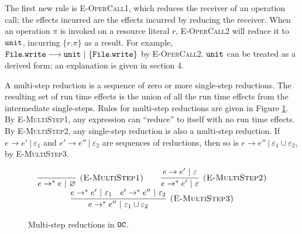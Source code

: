 The first new rule is \textsc{E-OperCall1}, which reduces the receiver of an operation call; the effects incurred are the effects incurred by reducing the receiver.  When an operation $\pi$ is invoked on a resource literal $r$, \textsc{E-OperCall2} will reduce it to $\mathtt{unit}$,
incurring $\{ r.\pi \}$ as a result. For example, $\mathtt{File.write} \longrightarrow \mathtt{unit}~|~\{ \mathtt{File.write} \}$ by \textsc{E-OperCall2}. $\mathtt{unit}$ can be treated as a derived form; an explanation is given in section 4.

A multi-step reduction is a sequence of zero
or more single-step reductions. The resulting set of run time effects is the union of all the run time effects from the intermediate single-steps. Rules for multi-step reductions are given in Figure \ref{fig:opercalc_multistep_defn}. By \textsc{E-MultiStep1}, any expression can ``reduce'' to itself with no run time effects. By \textsc{E-MultiStep2}, any single-step reduction is also a multi-step reduction. If $e \longrightarrow e'~|~\varepsilon_1$ and $e' \longrightarrow e''~|~\varepsilon_2$ are sequences of reductions, then so is $e \longrightarrow e''~|~\varepsilon_1 \cup \varepsilon_2$, by \textsc{E-MultiStep3}.

\begin{figure}[h]

\noindent
{}

\[
\begin{array}{c}

\infer[\textsc{(E-MultiStep1)}]
	{ e \rightarrow^{*}  e~|~\varnothing}
	{}
	\hspace{5ex}
\infer[\textsc{(E-MultiStep2)}]
	{ e \rightarrow^{*}  e'~|~\varepsilon}
	{ e \rightarrow  e'~|~\varepsilon}
\\
\infer[\textsc{(E-MultiStep3)}]
	{ e \rightarrow^{*}  e''~|~\varepsilon_1 \cup \varepsilon_2}
	{ e \rightarrow^{*}  e'~|~\varepsilon_1 &  e' \rightarrow^{*}  e''~|~\varepsilon_2}
\end{array}
\]

\vspace{-7pt}
\caption{Multi-step reductions in $\mathtt{OC}$.}
\label{fig:opercalc_multistep_defn}
\end{figure}

